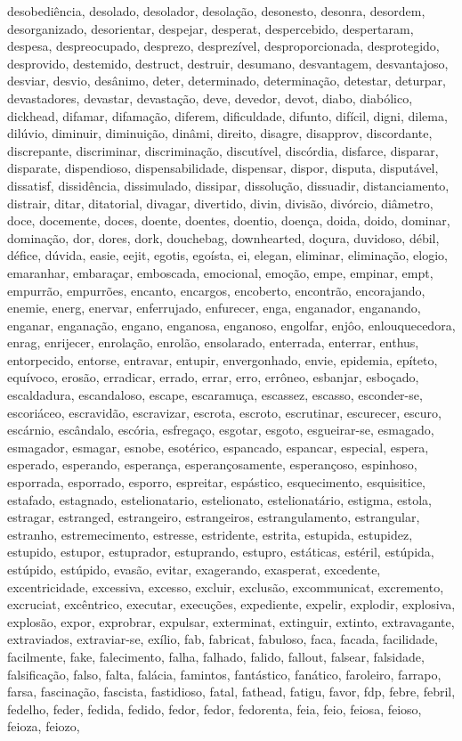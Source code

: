 desobediência, desolado, desolador, desolação, desonesto, desonra, desordem, desorganizado, desorientar, despejar, desperat, despercebido, despertaram, despesa, despreocupado, desprezo, desprezível, desproporcionada, desprotegido, desprovido, destemido, destruct, destruir, desumano, desvantagem, desvantajoso, desviar, desvio, desânimo, deter, determinado, determinação, detestar, deturpar, devastadores, devastar, devastação, deve, devedor, devot, diabo, diabólico, dickhead, difamar, difamação, diferem, dificuldade, difunto, difícil, digni, dilema, dilúvio, diminuir, diminuição, dinâmi, direito, disagre, disapprov, discordante, discrepante, discriminar, discriminação, discutível, discórdia, disfarce, disparar, disparate, dispendioso, dispensabilidade, dispensar, dispor, disputa, disputável, dissatisf, dissidência, dissimulado, dissipar, dissolução, dissuadir, distanciamento, distrair, ditar, ditatorial, divagar, divertido, divin, divisão, divórcio, diâmetro, doce, docemente, doces, doente, doentes, doentio, doença, doida, doido, dominar, dominação, dor, dores, dork, douchebag, downhearted, doçura, duvidoso, débil, défice, dúvida, easie, eejit, egotis, egoísta, ei, elegan, eliminar, eliminação, elogio, emaranhar, embaraçar, emboscada, emocional, emoção, empe, empinar, empt, empurrão, empurrões, encanto, encargos, encoberto, encontrão, encorajando, enemie, energ, enervar, enferrujado, enfurecer, enga, enganador, enganando, enganar, enganação, engano, enganosa, enganoso, engolfar, enjôo, enlouquecedora, enrag, enrijecer, enrolação, enrolão, ensolarado, enterrada, enterrar, enthus, entorpecido, entorse, entravar, entupir, envergonhado, envie, epidemia, epíteto, equívoco, erosão, erradicar, errado, errar, erro, errôneo, esbanjar, esboçado, escaldadura, escandaloso, escape, escaramuça, escassez, escasso, esconder-se, escoriáceo, escravidão, escravizar, escrota, escroto, escrutinar, escurecer, escuro, escárnio, escândalo, escória, esfregaço, esgotar, esgoto, esgueirar-se, esmagado, esmagador, esmagar, esnobe, esotérico, espancado, espancar, especial, espera, esperado, esperando, esperança, esperançosamente, esperançoso, espinhoso, esporrada, esporrado, esporro, espreitar, espástico, esquecimento, esquisitice, estafado, estagnado, estelionatario, estelionato, estelionatário, estigma, estola, estragar, estranged, estrangeiro, estrangeiros, estrangulamento, estrangular, estranho, estremecimento, estresse, estridente, estrita, estupida, estupidez, estupido, estupor, estuprador, estuprando, estupro, estáticas, estéril, estúpida, estúpido, estúpido, evasão, evitar, exagerando, exasperat, excedente, excentricidade, excessiva, excesso, excluir, exclusão, excommunicat, excremento, excruciat, excêntrico, executar, execuções, expediente, expelir, explodir, explosiva, explosão, expor, exprobrar, expulsar, exterminat, extinguir, extinto, extravagante, extraviados, extraviar-se, exílio, fab, fabricat, fabuloso, faca, facada, facilidade, facilmente, fake, falecimento, falha, falhado, falido, fallout, falsear, falsidade, falsificação, falso, falta, falácia, famintos, fantástico, fanático, faroleiro, farrapo, farsa, fascinação, fascista, fastidioso, fatal, fathead, fatigu, favor, fdp, febre, febril, fedelho, feder, fedida, fedido, fedor, fedor, fedorenta, feia, feio, feiosa, feioso, feioza, feiozo, 